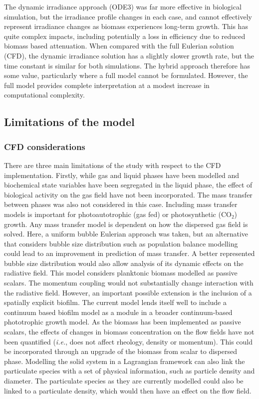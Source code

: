 The dynamic irradiance approach (ODE3) was far more effective in biological simulation, but the irradiance profile changes in each case, and cannot effectively represent irradiance changes as biomass experiences long-term growth. This has quite complex impacts, including potentially a loss in efficiency due to reduced biomass based attenuation. When compared with the full Eulerian solution (CFD), the dynamic irradiance solution has a slightly slower growth rate, but the time constant is similar for both simulations. The hybrid approach therefore has some value, particularly where a full model cannot be formulated. However, the full model provides complete interpretation at a modest increase in computational complexity. 

\subsection{Limitations of the model}
\label{ssec:limitations}
\subsubsection{CFD considerations}
There are three main limitations of the study with respect to the CFD implementation. Firstly, while gas and liquid phases have been modelled and biochemical state variables have been segregated in the liquid phase, the effect of biological activity on the gas field have not been incorporated. The mass transfer between phases was also not considered in this case. Including mass transfer models is important for photoautotrophic (gas fed) or photosynthetic ($\mathrm{CO_2}$) growth. Any mass transfer model is dependent on how the dispersed gas field is solved. Here, a uniform bubble Eulerian approach was taken, but an alternative that considers bubble size distribution such as population balance modelling could lead to an improvement in prediction of mass transfer. A better represented bubble size distribution would also allow analysis of its dynamic effects on the radiative field.  
This model considers planktonic biomass modelled as passive scalars. The momentum coupling would not substantially change interaction with the radiative field. However, an important possible extension is the inclusion of a spatially explicit biofilm. The current model lends itself well to include a continuum based biofilm model as a module in a broader continuum-based phototrophic growth model. 
\skippingparagraph
As the biomass has been implemented as passive scalars, the effects of changes in biomass concentration on the flow fields have not been quantified (\textit{i.e.}, does not affect rheology, density or momentum). This could be incorporated through an upgrade of the biomass from scalar to dispersed phase. Modelling the solid system in a Lagrangian framework can also link the particulate species with a set of physical information, such as particle density and diameter. The particulate species as they are currently modelled could also be linked to a particulate density, which would then have an effect on the flow field. 

